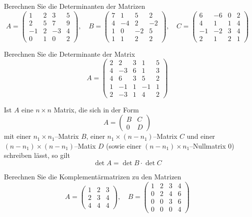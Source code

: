 \begin{aufgabe} Berechnen Sie die Determinanten der Matrizen
  	$$ A = \left( \begin{smallmatrix} 1 & 2 & 3 & 5 \\ 2 & 5 & 7 & 9\\ -1 & 2 & -3 & 4 \\
	0 & 1 & 0 & 2  \end{smallmatrix} \right),\quad 
  	B = \left( \begin{smallmatrix} 7 & 1 & 5 & 2 \\ 4 & -4 & 2 & -2 \\ 1 & 0 & -2 & 5 \\
	1 & 1 & 2 & 2  \end{smallmatrix} \right),\quad 
  	C =  \left( \begin{smallmatrix} 6 & -6 & 0 & 2 \\ 4 & 1 & 1 & 4 \\ -1 & -2 & 3 & 4 \\
  	2 & 1 & 2 & 1  \end{smallmatrix} \right)  $$
\end{aufgabe}

\begin{aufgabe} Berechnen Sie die Determinante der Matrix
  	$$ A = \left( \begin{matrix} 2 & 2 & 3 & 1 & 5 \\4  & -3 & 6 & 1 & 3 \\ 
  	4 & 6 & 3 & 5 & 2 \\ 1 & -1 & 1 & -1 & 1 \\ 2 & -3 & 1 & 4 & 2 \end{matrix} \right) $$
\end{aufgabe}

\begin{aufgabe} Ist $A$ eine $n \times n$ Matrix, die sich in der Form 
  	$$ A = \left( \begin{matrix} B & C \\ 0 & D \end{matrix} \right) $$
mit einer $n_1 \times n_1$--Matrix $B$, einer $n_1 \times (n-n_1)$--Matrix $C$ und 
einer $(n-n_1) \times (n-n_1)$--Matix $D$ (sowie einer 
$(n-n_1) \times n_1$--Nullmatrix 0) schreiben lässt, so gilt
  	$$ \det{A} = \det{B} \cdot \det{C} $$
\end{aufgabe}

\begin{aufgabe} Berechnen Sie die Komplementärmatrizen zu den Matrizen
  	$$ A = \left( \begin{matrix} 1 & 2 & 3 \\ 2 & 3 & 4 \\ 4 & 4 & 4 
	\end{matrix} \right), \quad B = \left( \begin{matrix} 1 & 2 & 3 & 4 \\
  	0 & 2 & 4 & 6 \\ 0 & 0 & 3 & 6 \\ 0 & 0 & 0 & 4 \end{matrix} \right) $$
\end{aufgabe}


